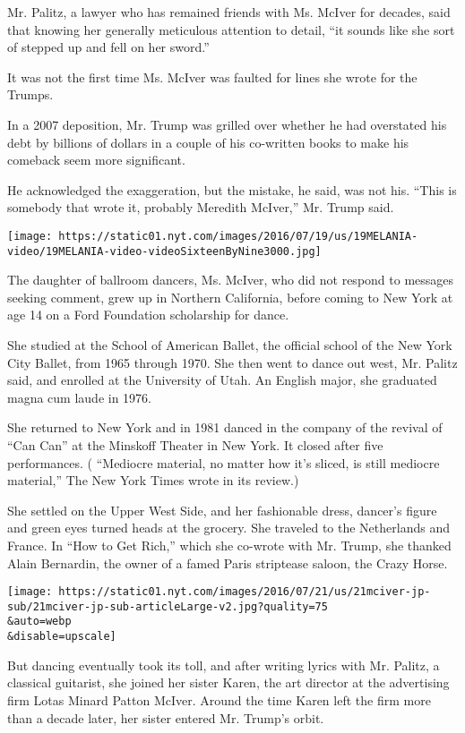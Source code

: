 Mr. Palitz, a lawyer who has remained friends with Ms. McIver for
decades, said that knowing her generally meticulous attention to detail,
``it sounds like she sort of stepped up and fell on her sword.''

It was not the first time Ms. McIver was faulted for lines she wrote for
the Trumps.

In a 2007 deposition, Mr. Trump was grilled over whether he had
overstated his debt by billions of dollars in a couple of his co-written
books to make his comeback seem more significant.

He acknowledged the exaggeration, but the mistake, he said, was not his.
``This is somebody that wrote it, probably Meredith McIver,'' Mr. Trump
said.

\texttt{[image: https://static01.nyt.com/images/2016/07/19/us/19MELANIA-video/19MELANIA-video-videoSixteenByNine3000.jpg]}

The daughter of ballroom dancers, Ms. McIver, who did not respond to
messages seeking comment, grew up in Northern California, before coming
to New York at age 14 on a Ford Foundation scholarship for dance.

She studied at the School of American Ballet, the official school of the
New York City Ballet, from 1965 through 1970. She then went to dance out
west, Mr. Palitz said, and enrolled at the University of Utah. An
English major, she graduated magna cum laude in 1976.

She returned to New York and in 1981 danced in the company of the
revival of ``Can Can'' at the Minskoff Theater in New York. It closed
after five performances. ( ``Mediocre material, no matter how it's
sliced, is still mediocre material,'' The New York Times wrote in its
review.)

She settled on the Upper West Side, and her fashionable dress, dancer's
figure and green eyes turned heads at the grocery. She traveled to the
Netherlands and France. In ``How to Get Rich,'' which she co-wrote with
Mr. Trump, she thanked Alain Bernardin, the owner of a famed Paris
striptease saloon, the Crazy Horse.

\texttt{[image: https://static01.nyt.com/images/2016/07/21/us/21mciver-jp-sub/21mciver-jp-sub-articleLarge-v2.jpg?quality=75\\\&auto=webp\\\&disable=upscale]}

But dancing eventually took its toll, and after writing lyrics with Mr.
Palitz, a classical guitarist, she joined her sister Karen, the art
director at the advertising firm Lotas Minard Patton McIver. Around the
time Karen left the firm more than a decade later, her sister entered
Mr. Trump's orbit.

